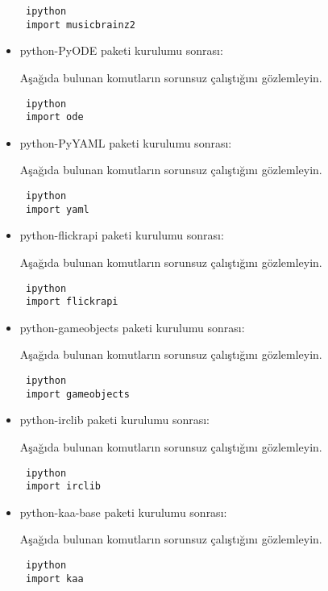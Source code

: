 \documentclass[a4paper,10pt]{article}
\begin{document}
\begin{itemize}
\begin{verbatim}
 ipython
 import musicbrainz2
\end{verbatim}

\item python-PyODE paketi kurulumu sonrası:

Aşağıda bulunan komutların sorunsuz çalıştığını gözlemleyin.

\begin{verbatim}
 ipython
 import ode
\end{verbatim}

\item python-PyYAML paketi kurulumu sonrası:

Aşağıda bulunan komutların sorunsuz çalıştığını gözlemleyin.

\begin{verbatim}
 ipython
 import yaml
\end{verbatim}

\item python-flickrapi paketi kurulumu sonrası:

Aşağıda bulunan komutların sorunsuz çalıştığını gözlemleyin.

\begin{verbatim}
 ipython
 import flickrapi
\end{verbatim}

\item python-gameobjects paketi kurulumu sonrası:

Aşağıda bulunan komutların sorunsuz çalıştığını gözlemleyin.

\begin{verbatim}
 ipython
 import gameobjects
\end{verbatim}

\item python-irclib paketi kurulumu sonrası:

Aşağıda bulunan komutların sorunsuz çalıştığını gözlemleyin.

\begin{verbatim}
 ipython
 import irclib
\end{verbatim}

\item python-kaa-base paketi kurulumu sonrası:

Aşağıda bulunan komutların sorunsuz çalıştığını gözlemleyin.

\begin{verbatim}
 ipython
 import kaa
\end{verbatim}


\end{itemize}
\end{document}
